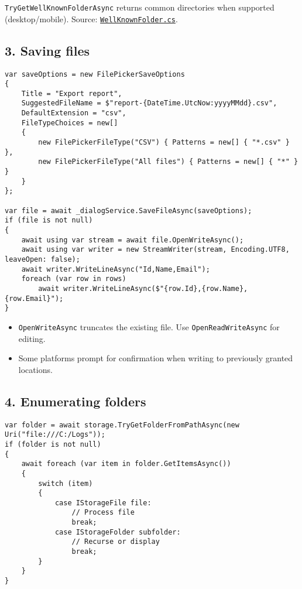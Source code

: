 \passthrough{\lstinline!TryGetWellKnownFolderAsync!} returns common
directories when supported (desktop/mobile). Source:
\href{https://github.com/AvaloniaUI/Avalonia/blob/master/src/Avalonia.Base/Platform/Storage/WellKnownFolder.cs}{\passthrough{\lstinline!WellKnownFolder.cs!}}.

\subsection{3. Saving files}\label{saving-files}

\begin{lstlisting}
var saveOptions = new FilePickerSaveOptions
{
    Title = "Export report",
    SuggestedFileName = $"report-{DateTime.UtcNow:yyyyMMdd}.csv",
    DefaultExtension = "csv",
    FileTypeChoices = new[]
    {
        new FilePickerFileType("CSV") { Patterns = new[] { "*.csv" } },
        new FilePickerFileType("All files") { Patterns = new[] { "*" } }
    }
};

var file = await _dialogService.SaveFileAsync(saveOptions);
if (file is not null)
{
    await using var stream = await file.OpenWriteAsync();
    await using var writer = new StreamWriter(stream, Encoding.UTF8, leaveOpen: false);
    await writer.WriteLineAsync("Id,Name,Email");
    foreach (var row in rows)
        await writer.WriteLineAsync($"{row.Id},{row.Name},{row.Email}");
}
\end{lstlisting}

\begin{itemize}
\tightlist
\item
  \passthrough{\lstinline!OpenWriteAsync!} truncates the existing file.
  Use \passthrough{\lstinline!OpenReadWriteAsync!} for editing.
\item
  Some platforms prompt for confirmation when writing to previously
  granted locations.
\end{itemize}

\subsection{4. Enumerating folders}\label{enumerating-folders}

\begin{lstlisting}
var folder = await storage.TryGetFolderFromPathAsync(new Uri("file:///C:/Logs"));
if (folder is not null)
{
    await foreach (var item in folder.GetItemsAsync())
    {
        switch (item)
        {
            case IStorageFile file:
                // Process file
                break;
            case IStorageFolder subfolder:
                // Recurse or display
                break;
        }
    }
}
\end{lstlisting}

